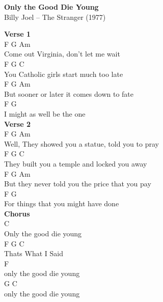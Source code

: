 \documentclass[a4paper]{article}
\begin{document}
    \begin{center}
        \textbf{Only the Good Die Young}
        ~\\
        Billy Joel -- The Stranger (1977)
    \end{center}
    {
        \scriptsize
        \textbf{Verse 1}
        ~\\
        {
            \cutive
            \obeyspaces
F                  G            Am
\\
Come out Virginia, don't let me wait
\\
    F                     G       C
\\
You Catholic girls start much too late
\\
    F                   G            Am
\\
But sooner or later it comes down to fate
\\
  F                    G
\\
I might as well be the one
\\

        }
        \textbf{Verse 2}
        ~\\
        {
            \cutive
            \obeyspaces
           F                    G           Am
\\
Well, They showed you a statue, told you to pray
\\
     F                       G         C
\\
They built you a temple and locked you away
\\
    F                       G              Am
\\
But they never told you the price that you pay
\\
    F                          G
\\
For things that you might have done
\\

        }
        \textbf{Chorus}
        ~\\
        {
            \cutive
            \obeyspaces
                  C
\\
Only the good die young
\\
F                  G  C
\\
  Thats What I Said
\\
                  F
\\
only the good die young
\\
              G       C
\\
only the good die young
\\

}}
\end{document}
